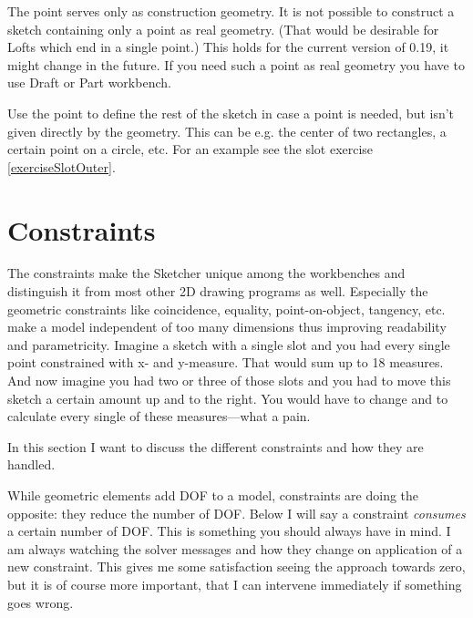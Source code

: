 \documentclass[12pt,titlepage]{article}
\let\partOrigin\part
\renewcommand\part{\newpage\partOrigin}
\begin{document}
The point serves only as construction geometry. It is not possible to construct a sketch containing only a point as real geometry. (That would be desirable for Lofts which end in a single point.) This holds for the current version of 0.19, it might change in the future. If you need such a point as real geometry you have to use Draft or Part workbench.

Use the point to define the rest of the sketch in case a point is needed, but isn't given directly by the geometry. This can be e.g. the center of two rectangles, a certain point on a circle, etc. For an example see the slot exercise \vref{exerciseSlotOuter}.

\newpage

\part{Constraints} \label{Constraints} The constraints make the Sketcher unique among the workbenches and distinguish it from most other 2D drawing programs as well. Especially the geometric constraints like coincidence, equality, point-on-object, tangency, etc. make a model independent of too many dimensions thus improving readability and parametricity. Imagine a sketch with a single slot and you had every single point constrained with x- and y-measure. That would sum up to 18 measures. And now imagine you had two or three of those slots and you had to move this sketch a certain amount up and to the right. You would have to change and to calculate every single of these measures---what a pain.

In this section I want to discuss the different constraints and how they are handled.

While geometric elements add DOF to a model, constraints are doing the opposite: they reduce the number of DOF. Below I will say a constraint \emph{consumes} a certain number of DOF. This is something you should always have in mind. I am always watching the solver messages and how they change on application of a new constraint. This gives me some satisfaction seeing the approach towards zero, but it is of course more important, that I can intervene immediately if something goes wrong.
\end{document}
